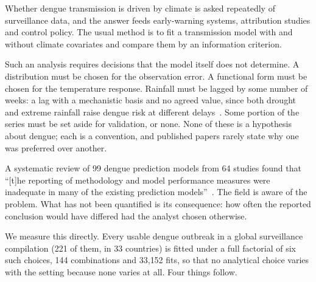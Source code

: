 \documentclass[11pt,a4paper]{article}
\begin{document}
Whether dengue transmission is driven by climate is asked repeatedly of
surveillance data, and the answer feeds early-warning systems, attribution
studies and control policy. The usual method is to fit a transmission model with
and without climate covariates and compare them by an information criterion.

Such an analysis requires decisions that the model itself does not determine. A
distribution must be chosen for the observation error. A functional form must be
chosen for the temperature response. Rainfall must be lagged by some number of
weeks: a lag with a mechanistic basis and no agreed value, since both drought
and extreme rainfall raise dengue risk at different delays~\cite{lowe2021}. Some portion of the series must be set aside for validation, or none. None
of these is a hypothesis about dengue; each is a convention, and published papers
rarely state why one was preferred over another.

A systematic review of 99 dengue prediction models from 64 studies found that
``[t]he reporting of methodology and model performance measures were inadequate
in many of the existing prediction models''~\cite{review2023}. The field is aware of the
problem. What has not been quantified is its consequence: how often the reported
conclusion would have differed had the analyst chosen otherwise.

We measure this directly. Every usable dengue outbreak in a global surveillance
compilation (221 of them, in 33 countries) is fitted under a full factorial
of six such choices, 144 combinations and 33{,}152 fits, so that no analytical
choice varies with the setting because none varies at all. Four things follow.
\end{document}
